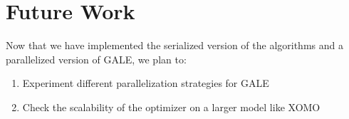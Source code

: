 \documentclass[conference]{IEEEtran}
\begin{document}
	
	\section{Future Work}
	\label{future}
	
	Now that we have implemented the serialized version of the algorithms and a parallelized version of GALE, we plan to:
	\begin{enumerate}
		\item Experiment different parallelization strategies for GALE
		\item Check the scalability of the optimizer on a larger model like XOMO\cite{menzies05xomo}
	\end{enumerate}
	
	
\end{document}
